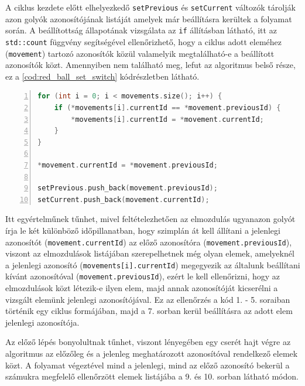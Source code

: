 \par A ciklus kezdete előtt elhelyezkedő \lstinline{setPrevious} és \lstinline{setCurrent} változók tárolják azon golyók azonosítójának listáját amelyek már beállításra kerültek a folyamat során. A beállítottság állapotának vizsgálata az \lstinline{if} állításban látható, itt az \lstinline{std::count} függvény segítségével ellenőrizhető, hogy a ciklus adott eleméhez (\lstinline{movement}) tartozó azonosítók közül valamelyik megtalálható-e a beállított azonosítók közt. Amennyiben nem található meg, lefut az algoritmus belső része, ez a \ref{cod:red_ball_set_switch} kódrészletben látható.

\vspace{5mm}
\hspace{-10mm}
\begin{minipage}{\linewidth}
\begin{lstlisting}[language=C++, numbers=left, caption={A piros golyók azonosítójának beállítása.}, label={cod:red_ball_set_switch}]
for (int i = 0; i < movements.size(); i++) {
    if (*movements[i].currentId == *movement.previousId) {
        *movements[i].currentId = *movement.currentId;
    }
}

*movement.currentId = *movement.previousId;

setPrevious.push_back(movement.previousId);
setCurrent.push_back(movement.currentId);
\end{lstlisting}
\end{minipage}

\par Itt egyértelműnek tűnhet, mivel feltételezhetően az elmozdulás ugyanazon golyót írja le két különböző időpillanatban, hogy szimplán át kell állítani a jelenlegi azonosítót (\lstinline{movement.currentId}) az előző azonosítóra (\lstinline{movement.previousId}), viszont az elmozdulások listájában szerepelhetnek még olyan elemek, amelyeknél a jelenlegi azonosító (\lstinline{movements[i].currentId}) megegyezik az általunk beállítani kívánt azonosítóval (\lstinline{movement.previousId}), ezért le kell ellenőrizni, hogy az elmozdulások közt létezik-e ilyen elem, majd annak azonosítóját kicserélni a vizsgált elemünk jelenlegi azonosítójával. Ez az ellenőrzés a kód 1. - 5. soraiban történik egy ciklus formájában, majd a 7. sorban kerül beállításra az adott elem jelenlegi azonosítója.
\par Az előző lépés bonyolultnak tűnhet, viszont lényegében egy cserét hajt végre az algoritmus az előzőleg és a jelenleg meghatározott azonosítóval rendelkező elemek közt. A folyamat végeztével mind a jelenlegi, mind az előző azonosító bekerül a számukra megfelelő ellenőrzött elemek listájába a 9. és 10. sorban látható módon.

